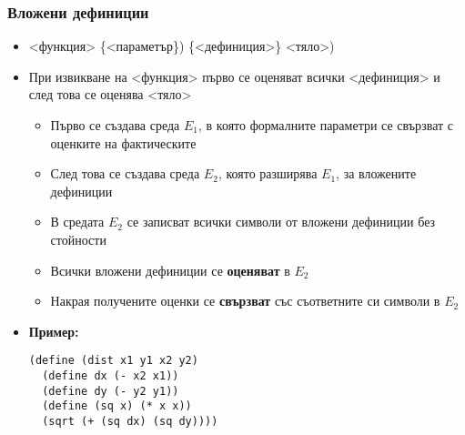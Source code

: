 \documentclass[alsotrans,beameroptions={aspectratio=169}]{beamerswitch}
\begin{document}
\begin{frame}[fragile]
  \frametitle{Вложени дефиниции}

  \begin{itemize}[<+->]
  \item {}<функция> \{<параметър\}\tta) \{<дефиниция>\} <тяло>\tta)
  \item При извикване на <функция> първо се оценяват всички <дефиниция> и след това се оценява <тяло>
    \begin{itemize}
    \item Първо се създава среда $E_1$, в която формалните параметри се свързват с оценките на фактическите
    \item След това се създава среда $E_2$, която разширява $E_1$, за вложените дефиниции
    \item В средата $E_2$ се записват всички символи от вложени дефиниции \alert{без стойности}
    \item Всички вложени дефиниции се \textbf{оценяват} в $E_2$
    \item Накрая получените оценки се \textbf{свързват} със съответните си символи в $E_2$
    \end{itemize}
  \item \textbf{Пример:}\hspace{5ex}
    \begin{minipage}[t]{.5\textwidth}
      \lstsmall
\begin{lstlisting}[aboveskip=-1.4\medskipamount]
(define (dist x1 y1 x2 y2)
  (define dx (- x2 x1))
  (define dy (- y2 y1))
  (define (sq x) (* x x))
  (sqrt (+ (sq dx) (sq dy))))
\end{lstlisting}
    \end{minipage}
  \end{itemize}
\end{frame}
\end{document}
